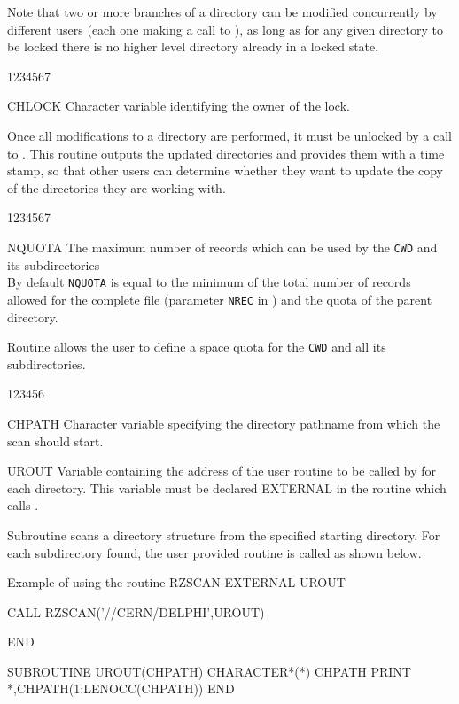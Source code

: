 Note that two or more branches of a directory can be modified
concurrently
by different users (each one making a call to ), as long as
for any given directory to be locked there is no higher level
directory already in a locked state.

\begin{DLtt}{1234567}
\item[CHLOCK]Character variable identifying the owner of the lock.
\end{DLtt}

Once all modifications to a directory are performed, it must
be unlocked by a call to . This routine outputs the updated
directories and provides them with a time stamp, so that other users
can determine whether they want to update the copy of the directories
they are working with.

\Idesc
\begin{DLtt}{1234567}
\item[NQUOTA]The maximum number of records which can be used by the {\tt CWD}
and its subdirectories\\
By default {\tt NQUOTA} is equal to the minimum of the total number of
records allowed for the complete file (parameter {\tt NREC}
in ) and the quota of the parent directory.
\end{DLtt}

Routine  allows the user to define a
space quota for the {\tt CWD} and all its subdirectories.


\begin{DLtt}{123456}
\item[CHPATH]Character variable specifying the directory pathname
from which the scan should start.
\item[UROUT]Variable containing the address of the user
routine to be called by  for each directory.
This variable must be declared EXTERNAL in the routine
which calls .
\end{DLtt}

Subroutine  scans a directory structure from the specified
starting directory. For each subdirectory found, the user provided
routine  is called as shown below.
\begin{XMPt}{Example of using the routine RZSCAN}
      EXTERNAL UROUT

      CALL RZSCAN('//CERN/DELPHI',UROUT)

      END

      SUBROUTINE UROUT(CHPATH)
      CHARACTER*(*)    CHPATH
      PRINT *,CHPATH(1:LENOCC(CHPATH))
      END

\end{XMPt}

